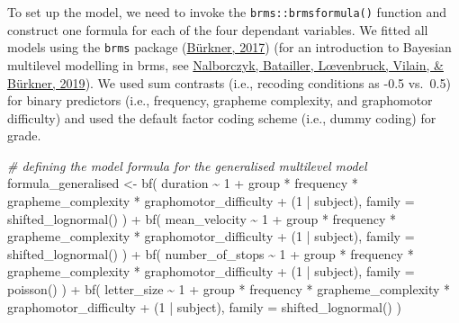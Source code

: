 \documentclass[
  11pt,
  english,
  ,doc,mask,floatsintext]{apa6}
\newenvironment{Shaded}{}{}
\newcommand{\AttributeTok}[1]{\textcolor[rgb]{0.49,0.56,0.16}{#1}}
\newcommand{\CommentTok}[1]{\textcolor[rgb]{0.38,0.63,0.69}{\textit{#1}}}
\newcommand{\DecValTok}[1]{\textcolor[rgb]{0.25,0.63,0.44}{#1}}
\newcommand{\FunctionTok}[1]{\textcolor[rgb]{0.02,0.16,0.49}{#1}}
\newcommand{\NormalTok}[1]{#1}
\newcommand{\OtherTok}[1]{\textcolor[rgb]{0.00,0.44,0.13}{#1}}
\newcommand{\SpecialCharTok}[1]{\textcolor[rgb]{0.25,0.44,0.63}{#1}}
\begin{document}
To set up the model, we need to invoke the \texttt{brms::brmsformula()} function and construct one formula for each of the four dependant variables. We fitted all models using the \texttt{brms} package (\protect\hyperlink{ref-R-brms_a}{Bürkner, 2017}) (for an introduction to Bayesian multilevel modelling in brms, see \protect\hyperlink{ref-nalborczyk_introduction_2019}{Nalborczyk, Batailler, Lœvenbruck, Vilain, \& Bürkner, 2019}). We used sum contrasts (i.e., recoding conditions as -0.5 vs.~0.5) for binary predictors (i.e., frequency, grapheme complexity, and graphomotor difficulty) and used the default factor coding scheme (i.e., dummy coding) for grade.

\begin{Shaded}
\begin{Highlighting}[]
\CommentTok{\# defining the model formula for the generalised multilevel model}
\NormalTok{formula\_generalised }\OtherTok{\textless{}{-}}
    \FunctionTok{bf}\NormalTok{(}
\NormalTok{        duration }\SpecialCharTok{\textasciitilde{}} \DecValTok{1} \SpecialCharTok{+}\NormalTok{ group }\SpecialCharTok{*}\NormalTok{ frequency }\SpecialCharTok{*}\NormalTok{ grapheme\_complexity }\SpecialCharTok{*}
\NormalTok{            graphomotor\_difficulty }\SpecialCharTok{+}\NormalTok{ (}\DecValTok{1} \SpecialCharTok{|}\NormalTok{ subject),}
        \AttributeTok{family =} \FunctionTok{shifted\_lognormal}\NormalTok{()}
\NormalTok{        ) }\SpecialCharTok{+}
    \FunctionTok{bf}\NormalTok{(}
\NormalTok{        mean\_velocity }\SpecialCharTok{\textasciitilde{}} \DecValTok{1} \SpecialCharTok{+}\NormalTok{ group }\SpecialCharTok{*}\NormalTok{ frequency }\SpecialCharTok{*}\NormalTok{ grapheme\_complexity }\SpecialCharTok{*}
\NormalTok{            graphomotor\_difficulty }\SpecialCharTok{+}\NormalTok{ (}\DecValTok{1} \SpecialCharTok{|}\NormalTok{ subject),}
        \AttributeTok{family =} \FunctionTok{shifted\_lognormal}\NormalTok{()}
\NormalTok{        ) }\SpecialCharTok{+}
    \FunctionTok{bf}\NormalTok{(}
\NormalTok{        number\_of\_stops }\SpecialCharTok{\textasciitilde{}} \DecValTok{1} \SpecialCharTok{+}\NormalTok{ group }\SpecialCharTok{*}\NormalTok{ frequency }\SpecialCharTok{*}\NormalTok{ grapheme\_complexity }\SpecialCharTok{*}
\NormalTok{            graphomotor\_difficulty }\SpecialCharTok{+}\NormalTok{ (}\DecValTok{1} \SpecialCharTok{|}\NormalTok{ subject),}
        \AttributeTok{family =} \FunctionTok{poisson}\NormalTok{()}
\NormalTok{        ) }\SpecialCharTok{+}
    \FunctionTok{bf}\NormalTok{(}
\NormalTok{        letter\_size }\SpecialCharTok{\textasciitilde{}} \DecValTok{1} \SpecialCharTok{+}\NormalTok{ group }\SpecialCharTok{*}\NormalTok{ frequency }\SpecialCharTok{*}\NormalTok{ grapheme\_complexity }\SpecialCharTok{*}
\NormalTok{            graphomotor\_difficulty }\SpecialCharTok{+}\NormalTok{ (}\DecValTok{1} \SpecialCharTok{|}\NormalTok{ subject),}
        \AttributeTok{family =} \FunctionTok{shifted\_lognormal}\NormalTok{()}
\NormalTok{        )}


\end{Highlighting}
\end{Shaded}
\end{document}
